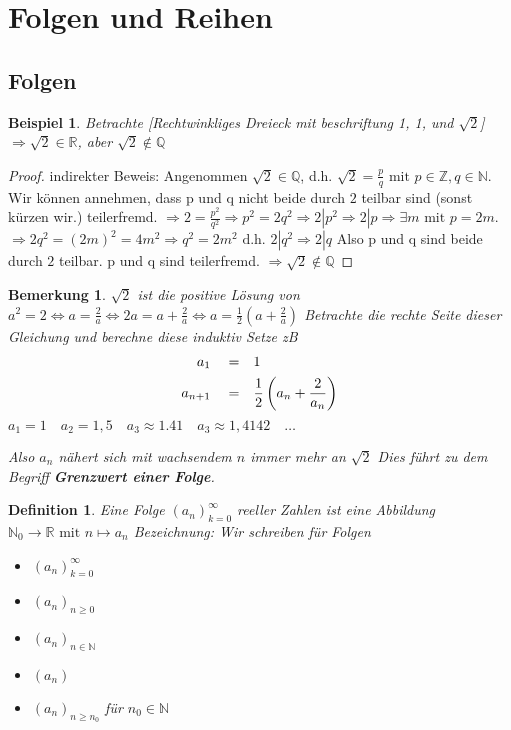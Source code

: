 \documentclass[a4paper,titlepage,oneside]{article}
\def\N{\ensuremath{\mathbb{N}} }
\def\Q{\ensuremath{\mathbb{Q}} }
\def\Z{\ensuremath{\mathbb{Z}} }
\def\R{\ensuremath{\mathbb{R}} }
\def\WSP{\text{Widerspruch.}}
\newcommand{\alQ}[1]{\ensuremath{\quad#1&\quad}}
\theoremstyle{thmstyle}
\newtheorem{defi}[satz]{Definition}
\newtheorem{bsp}[satz]{Beispiel}
\newtheorem{bem}[satz]{Bemerkung}
\begin{document}
\section{Folgen und Reihen}
\subsection{Folgen}

\begin{bsp}
Betrachte [Rechtwinkliges Dreieck mit beschriftung 1, 1, und $\sqrt{2}$]
\( \Rightarrow \sqrt{2} \in \R\), aber \(\sqrt{2} \not\in \Q\)
\end{bsp}
\begin{proof}
indirekter Beweis: Angenommen \(\sqrt{2} \in \Q\), d.h. 
$\sqrt{2} = \frac{p}{q}\text{ mit }p \in \Z, q \in \N.$
Wir können annehmen, dass p und q nicht beide durch $2$ teilbar sind (sonst kürzen wir.) teilerfremd.
\(\Rightarrow 2 = \frac{p^2}{q^2} \Rightarrow p^2 = 2q^2 \Rightarrow 2 | p^2 \Rightarrow 2 | p \Rightarrow \exists m \text{ mit } p = 2 m.\)
\( \Rightarrow 2q^2 = (2m)^2 = 4m^2 \Rightarrow q^2 = 2m^2 \text{ d.h. } 2 | q^2  \Rightarrow 2 | q \) Also p und q sind beide durch $2$ teilbar.  \WSP p und q sind teilerfremd. $\Rightarrow \sqrt{2} \not\in \Q$
\end{proof}

\begin{bem}
\( \sqrt{2} \) ist die positive Lösung von \(a^2 = 2 \Leftrightarrow a = \frac{2}{a} \Leftrightarrow  2a = a + \frac{2}{a} \Leftrightarrow a= \frac{1}{2}\left(a + \frac{2}{a}\right)\)
Betrachte die rechte Seite dieser Gleichung und berechne diese induktiv
Setze zB
\begin{align*}
a_1 \alQ{=} 1\\
a_{n+1} \alQ{=} \frac{1}{2}\left(a_n + \frac{2}{a_n}\right)
\end{align*}
\(a_1 = 1 \quad a_2 = 1,5 \quad a_3 \approx 1.41 \quad a_3 \approx 1,4142 \quad \dots \)


Also \(a_n\) nähert sich mit wachsendem \(n\) immer mehr an \(\sqrt{2}\)
Dies führt zu dem Begriff \textbf{Grenzwert einer Folge}.
\end{bem}

\begin{defi}
Eine Folge $(a_n)_{k=0}^{\infty}$ reeller Zahlen ist eine Abbildung $\N_0 \rightarrow \R\text{ mit } n \mapsto a_n$ 
Bezeichnung: Wir schreiben für Folgen
\begin{itemize}
\item $(a_n)_{k=0}^{\infty}$
\item $(a_n)_{n\ge0}$
\item $(a_n)_{n\in\N}$
\item $(a_n)$
\item $(a_n)_{n\ge n_0}$ für $n_0 \in \N$
\end{itemize}
\end{defi}
\end{document}
